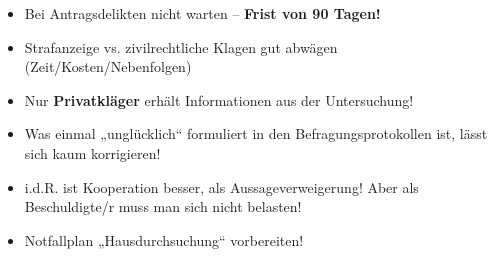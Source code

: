 \begin{itemize}
	\tightlist
	\item Bei Antragsdelikten nicht warten – \textbf{Frist von 90 Tagen!}
	\item Strafanzeige vs. zivilrechtliche Klagen gut abwägen
	(Zeit/Kosten/Nebenfolgen)
	\item Nur \textbf{Privatkläger} erhält Informationen aus der Untersuchung!
	\item Was einmal „unglücklich“ formuliert in den Befragungsprotokollen ist,
	lässt sich kaum korrigieren!
	\item i.d.R. ist Kooperation besser, als Aussageverweigerung! Aber als
	Beschuldigte/r muss man sich nicht belasten!
	\item Notfallplan „Hausdurchsuchung“ vorbereiten!
\end{itemize}


